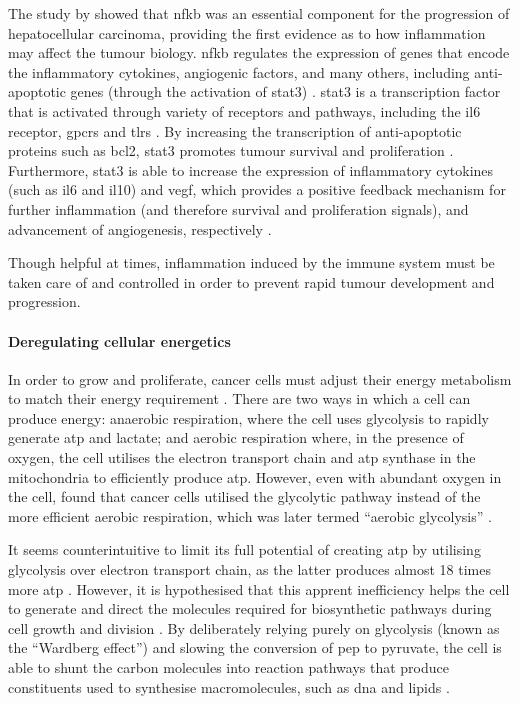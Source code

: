 The study by \citep{Pikarsky2004} showed that \gls{nfkb} was an essential component for the progression of hepatocellular carcinoma, providing the first evidence as to how inflammation may affect the tumour biology.
\gls{nfkb} regulates the expression of genes that encode the inflammatory cytokines, angiogenic factors, and many others, including anti-apoptotic genes (through the activation of \gls{stat3}) \citep{Elinav2013,Mantovani2008}.
\gls{stat3} is a transcription factor that is activated through variety of receptors and pathways, including the \gls{il6} receptor, \glspl{gpcr} and \glspl{tlr} \citep{Yu2007,Yu2014}.
By increasing the transcription of anti-apoptotic proteins such as \gls{bcl2}, \gls{stat3} promotes tumour survival and proliferation \citep{Yu2007}.
Furthermore, \gls{stat3} is able to increase the expression of inflammatory cytokines (such as \gls{il6} and \acrshort{il10}) and \acrshort{vegf}, which provides a positive feedback mechanism for further inflammation (and therefore survival and proliferation signals), and advancement of angiogenesis, respectively \citep{Yu2007}.

Though helpful at times, inflammation induced by the immune system must be taken care of and controlled in order to prevent rapid tumour development and progression.

\paragraph{Deregulating cellular energetics}

\noindent
In order to grow and proliferate, cancer cells must adjust their energy metabolism to match their energy requirement \citet{Hanahan2011}.
There are two ways in which a cell can produce energy: anaerobic respiration, where the cell uses glycolysis to rapidly generate \gls{atp} and lactate; and aerobic respiration where, in the presence of oxygen, the cell utilises the electron transport chain and \gls{atp} synthase in the mitochondria to efficiently produce \gls{atp}.
However, even with abundant oxygen in the cell, \citet{Wardburg1956} found that cancer cells utilised the glycolytic pathway instead of the more efficient aerobic respiration, which was later termed ``aerobic glycolysis'' \citep{Hanahan2011}.

It seems counterintuitive to limit its full potential of creating \gls{atp} by utilising glycolysis over electron transport chain, as the latter produces almost 18 times more \gls{atp} \citep{Hanahan2011, VanderHeiden2009}.
However, it is hypothesised  that this apprent inefficiency helps the cell to generate and direct the molecules required for biosynthetic pathways during cell growth and division \citep{Cairns2011,VanderHeiden2009}.
By deliberately relying purely on glycolysis (known as the ``Wardberg effect'') and slowing the conversion of \gls{pep} to pyruvate, the cell is able to shunt the carbon molecules into reaction pathways that produce constituents used to synthesise macromolecules, such as \acrshort{dna} and lipids \citep{Cairns2011,VanderHeiden2009}.

